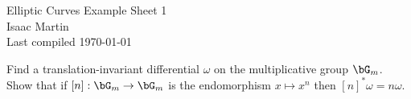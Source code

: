 


\pagestyle{empty}
	\LARGE
\begin{center}
	Elliptic Curves Example Sheet 1\\
	\Large
	Isaac Martin \\
    Last compiled \today
\end{center}
\normalsize
\vspace{-2mm}
\hru

\begin{homework}[e]
	\prob
	\prob
	\prob Find a translation-invariant differential $\omega$ on the multiplicative group $\bG_m$. Show that if $[n]:\bG_m \to \bG_m$ is the endomorphism $x \mapsto x^n$ then $[n]^*\omega = n\omega$.
	\begin{prf}
		
	\end{prf}
\end{homework}


